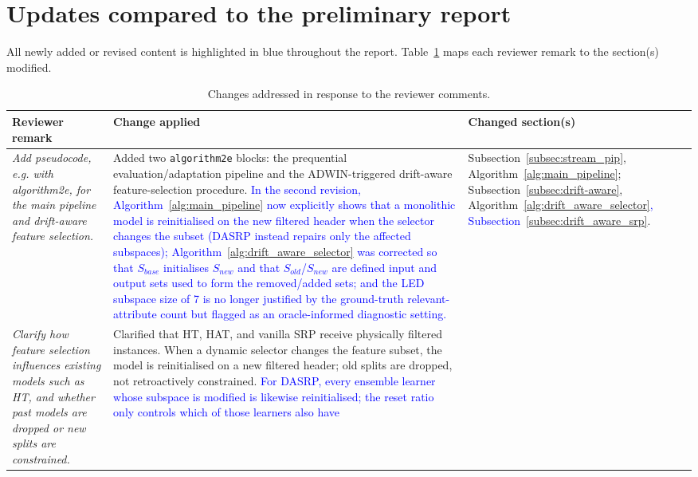 \documentclass[12pt]{article}
\newcommand{\new}[1]{\textcolor{blue}{#1}}
\begin{document}
\section{Updates compared to the preliminary report}
\label{sec:response}

{\color{blue}
All newly added or revised content is highlighted in blue throughout the report.
Table~\ref{tab:changes} maps each reviewer remark to the section(s) modified.

\footnotesize
\begin{longtable}{|>{\raggedright\arraybackslash}p{}
                |>{\raggedright\arraybackslash}p{}
                |>{\raggedright\arraybackslash}p{}|}
\caption{Changes addressed in response to the reviewer comments.}
\label{tab:changes}\\
\hline
\textbf{Reviewer remark} & \textbf{Change applied} & \textbf{Changed section(s)} \\
\hline
\textit{Add pseudocode, e.g. with algorithm2e, for the main pipeline and
drift-aware feature selection.}
&
Added two \texttt{algorithm2e} blocks: the prequential evaluation/adaptation
pipeline and the ADWIN-triggered drift-aware feature-selection procedure.
\new{In the second revision, Algorithm~\ref{alg:main_pipeline} now explicitly
shows that a monolithic model is reinitialised on the new filtered header when
the selector changes the subset (DASRP instead repairs only the affected
subspaces); Algorithm~\ref{alg:drift_aware_selector} was corrected so that
$S_{base}$ initialises $S_{new}$ and that $S_{old}$/$S_{new}$ are defined input
and output sets used to form the removed/added sets; and the LED subspace size
of 7 is no longer justified by the ground-truth relevant-attribute count but
flagged as an oracle-informed diagnostic setting.}
&
Subsection~\ref{subsec:stream_pip}, Algorithm~\ref{alg:main_pipeline}; Subsection~\ref{subsec:drift-aware},
Algorithm~\ref{alg:drift_aware_selector}\new{, Subsection~\ref{subsec:drift_aware_srp}}. \\
\hline
\textit{Clarify how feature selection influences existing models such as HT,
and whether past models are dropped or new splits are constrained.}
&
Clarified that HT, HAT, and vanilla SRP receive physically filtered instances.
When a dynamic selector changes the feature subset, the model is reinitialised
on a new filtered header; old splits are dropped, not retroactively constrained.
\new{For DASRP, every ensemble learner whose subspace is modified is likewise
reinitialised; the reset ratio only controls which of those learners also have
}
\end{longtable}}
\end{document}
